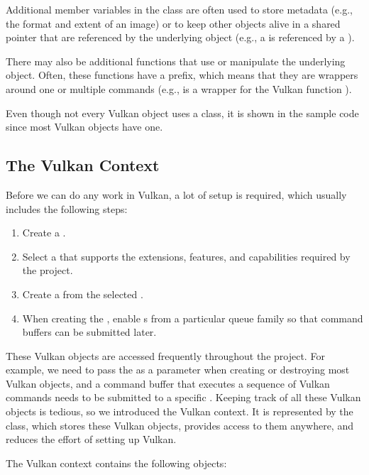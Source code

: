 Additional member variables in the class are often used to store metadata (e.g., the format and extent of an image) or to keep other objects alive in a shared pointer that are referenced by the underlying object (e.g., a  is referenced by a ).

There may also be additional functions that use or manipulate the underlying object. Often, these functions have a  prefix, which means that they are wrappers around one or multiple commands (e.g.,  is a wrapper for the Vulkan function ).

Even though not every Vulkan object uses a  class, it is shown in the sample code since most Vulkan objects have one.

\subsection{The Vulkan Context}

Before we can do any work in Vulkan, a lot of setup is required, which usually includes the following steps:

\begin{enumerate}
    \item Create a .
    \item Select a  that supports the extensions, features, and capabilities required by the project.
    \item Create a  from the selected .
    \item When creating the , enable s from a particular queue family so that command buffers can be submitted later.
\end{enumerate}

These Vulkan objects are accessed frequently throughout the project. For example, we need to pass the  as a parameter when creating or destroying most Vulkan objects, and a command buffer that executes a sequence of Vulkan commands needs to be submitted to a specific . Keeping track of all these Vulkan objects is tedious, so we introduced the Vulkan context. It is represented by the  class, which stores these Vulkan objects, provides access to them anywhere, and reduces the effort of setting up Vulkan.

The Vulkan context contains the following objects:

